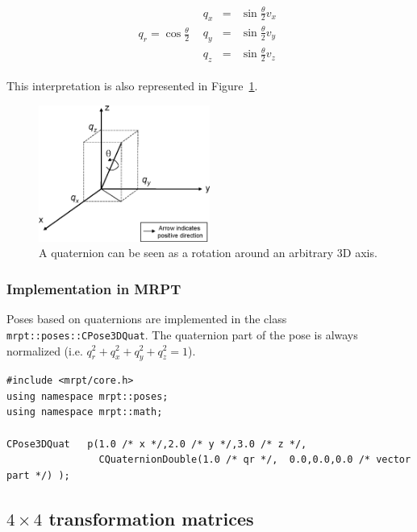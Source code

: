 \documentclass[a4paper,10pt]{report}
\begin{document}
\begin{equation*}
\begin{array}{cc}
q_r = \cos\frac{\theta}{2}  &  
  \begin{array}{rcl}
    q_x &=& \sin\frac{\theta}{2} v_x  \\
    q_y &=& \sin\frac{\theta}{2} v_y  \\
    q_z &=& \sin\frac{\theta}{2} v_z  
  \end{array}
\end{array}
\end{equation*}

This interpretation is also represented in Figure~\ref{fig:quat}.

\begin{figure}[h]
\centering
\includegraphics[width=0.50\textwidth]{quaternion.eps}
\caption{A quaternion can be seen as a rotation around an arbitrary 3D axis.}
\label{fig:quat}
\end{figure}


\subsubsection{Implementation in MRPT}

Poses based on quaternions are implemented in the class \texttt{mrpt::poses::CPose3DQuat}. 
The quaternion part of the pose is always normalized (i.e. $q_r^2+q_x^2+q_y^2+q_z^2=1$).

\begin{lstlisting}
#include <mrpt/core.h> 
using namespace mrpt::poses; 
using namespace mrpt::math; 

CPose3DQuat   p(1.0 /* x */,2.0 /* y */,3.0 /* z */, 
                CQuaternionDouble(1.0 /* qr */,  0.0,0.0,0.0 /* vector part */) );
\end{lstlisting}


\newpage


\subsection{$4 \times 4$ transformation matrices}
\end{document}
